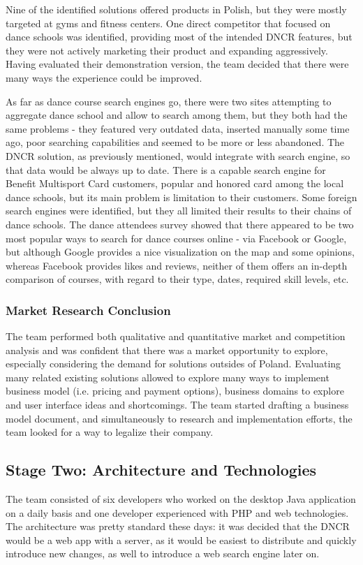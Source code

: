 \documentclass{article}
\begin{document}
Nine of the identified solutions offered products in Polish, but they were mostly targeted at gyms and fitness centers. One direct competitor that focused on dance schools was identified, providing most of the intended DNCR features, but they were not actively marketing their product and expanding aggressively. Having evaluated their demonstration version, the team decided that there were many ways the experience could be improved.

As far as dance course search engines go, there were two sites attempting to aggregate dance school and allow to search among them, but they both had the same problems - they featured very outdated data, inserted manually some time ago, poor searching capabilities and seemed to be more or less abandoned. The DNCR solution, as previously mentioned, would integrate with search engine, so that data would be always up to date. There is a capable search engine for Benefit Multisport Card customers, popular and honored card among the local dance schools, but its main problem is limitation to their customers. Some foreign search engines were identified, but they all limited their results to their chains of dance schools. The dance attendees survey showed that there appeared to be two most popular ways to search for dance courses online - via Facebook or Google, but although Google provides a nice visualization on the map and some opinions, whereas Facebook provides likes and reviews, neither of them offers an in-depth comparison of courses, with regard to their type, dates, required skill levels, etc.

\subsubsection{Market Research Conclusion}
The team performed both qualitative and quantitative market and competition analysis and was confident that there was a market opportunity to explore, especially considering the demand for solutions outsides of Poland. Evaluating many related existing solutions allowed to explore many ways to implement business model (i.e. pricing and payment options), business domains to explore and user interface ideas and shortcomings. The team started drafting a business model document, and simultaneously to research and implementation efforts, the team looked for a way to legalize their company.

\subsection{Stage Two: Architecture and Technologies}
The team consisted of six developers who worked on the desktop Java application on a daily basis and one developer experienced with PHP and web technologies. The architecture was pretty standard these days: it was decided that the DNCR would be a web app with a server, as it would be easiest to distribute and quickly introduce new changes, as well to introduce a web search engine later on.
\end{document}
